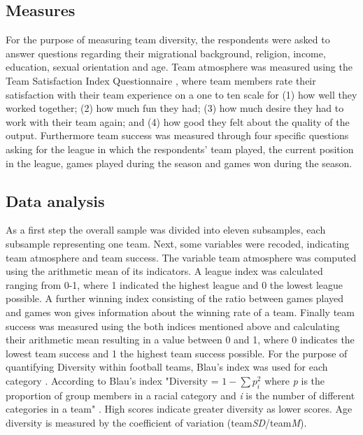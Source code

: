 \documentclass[	
	12pt, %
	a4paper, %
]{scrartcl}\usepackage[]{graphicx}\usepackage[]{color}
\begin{document}
\subsection{Measures} 
For the purpose of measuring team diversity, the respondents were asked to answer questions regarding their migrational background, religion, income, education, sexual orientation and age. Team atmosphere was measured using the Team Satisfaction Index Questionnaire \cite{Basadur2001}, where team members rate their satisfaction with their team experience on a one to ten scale for (1) how well they worked 
together; (2) how much fun they had; (3) how much desire they had to work with their team 
again; and (4) how good they felt about the quality of the output. Furthermore team success was measured through four specific questions asking for the league in which the respondents' team played, the current position in the league, games played during the season and games won during the season.

\subsection{Data analysis}
As a first step the overall sample was divided into eleven subsamples, each subsample representing one team. Next, some variables were recoded, indicating team atmosphere and team success. The variable team atmosphere was computed using the arithmetic mean of its indicators. A league index was calculated ranging from 0-1, where 1 indicated the highest league and 0 the lowest league possible. A further winning index consisting of the ratio between games played and games won gives information about the winning rate of a team. Finally team success was measured using the both indices mentioned above and calculating their arithmetic mean resulting in a value between 0 and 1, where 0 indicates the lowest team success and 1 the highest team success possible. For the purpose of quantifying Diversity within football teams, Blau's index was used for each category \cite{Blau1977}. According to Blau's index "Diversity = $ 1 - \sum p_i^{2} $ where \textit{p} is the proportion of group members in a racial category and \textit{i} is the number of different categories in a team" \cite[p.~599]{Timmerman2000}. High scores indicate greater diversity as lower scores. Age diversity is measured by the coefficient of variation (team\textit{SD}/team\textit{M}).
\end{document}
